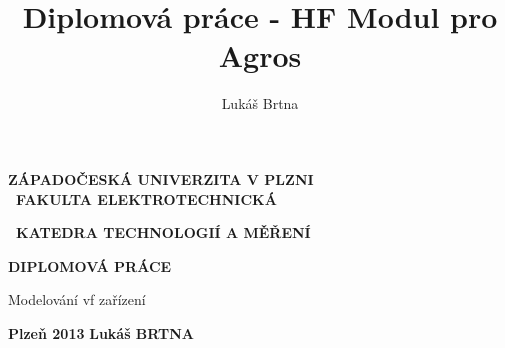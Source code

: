 \documentclass[12pt,a4paper,oneside]{article}
\author{Lukáš Brtna}
\title{Diplomová práce - HF Modul pro Agros}
\numberwithin{equation}{section} %
\numberwithin{figure}{section} %
\numberwithin{table}{section} %
\newcommand{\tg}{\mathrm{tg}\ }
\newcommand{\grad}{\mathrm{grad}\ }
\newcommand{\rot}{\mathrm{rot}\ }
\renewcommand{\div}{\mathrm{div}\ }
\begin{document}
\renewcommand\refname{Použitá literatura} %
\newcommand{\cotg}{\mathop{\rm cotg}\nolimits} %
\newcommand{\udiv}{\mathop{\rm div}\nolimits} %
\newcommand{\ud}{\mathrm{d}} %



\pagestyle{empty} %


\begin{titlepage} 
\begin{center}

\begin{large}
\textbf{ZÁPADOČESKÁ UNIVERZITA V PLZNI\\
~FAKULTA ELEKTROTECHNICKÁ\\
\vspace*{5mm}}
\end{large}
\textbf{~KATEDRA TECHNOLOGIÍ A MĚŘENÍ}
\vspace{70mm}\\

\begin{Huge}
\textbf{DIPLOMOVÁ PRÁCE}
\vspace{8mm}\\
\end{Huge}
\begin{LARGE}
Modelování vf zařízení \vspace{90mm}\\
\end{LARGE}
\end{center}

\begin{flushleft}
\begin{large}
\textbf{Plzeň 2013}
\hfill
\textbf{Lukáš BRTNA}
\end{large}
\end{flushleft}
\end{titlepage}
\newpage
\end{document}
